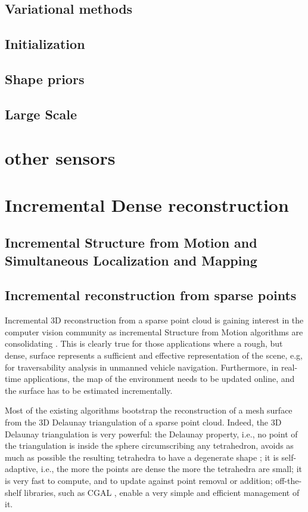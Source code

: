 \subsection{Variational methods}
\subsection{Initialization}
\subsection{Shape priors}
\subsection{Large Scale}
\section{other sensors}


\section{Incremental Dense reconstruction}
\subsection{Incremental Structure from Motion and Simultaneous Localization and Mapping}

\subsection{Incremental reconstruction from sparse points}
Incremental 3D reconstruction from a sparse point cloud is gaining interest in the computer vision community as incremental Structure from Motion algorithms are consolidating  \cite{wu13}. 
This is clearly true for those applications where a rough, but dense, surface represents a sufficient and effective representation of the scene, e.g, for traversability analysis in unmanned vehicle navigation. 
Furthermore, in real-time applications, the map of the environment needs to be updated online, and the surface has to be estimated incrementally. 

Most of the existing algorithms \cite{Lovi_et_al_11,Pan_et_al09,litvinov_lhuillier_13,litvinov_Lhiuller14} bootstrap the reconstruction of a mesh surface from the 3D Delaunay triangulation of a sparse point cloud. Indeed, the 3D Delaunay triangulation  is very powerful:
the Delaunay property, i.e., no point of the triangulation is inside the sphere circumscribing any tetrahedron, avoids as much as possible the resulting tetrahedra to have a degenerate shape \cite{Maur_02}; it is self-adaptive, i.e., the more the points are dense the more the tetrahedra are small; it is very fast to compute, and to  update against point removal or addition; off-the-shelf libraries, such as CGAL \cite{cgal}, enable a very simple and efficient management of it. 

